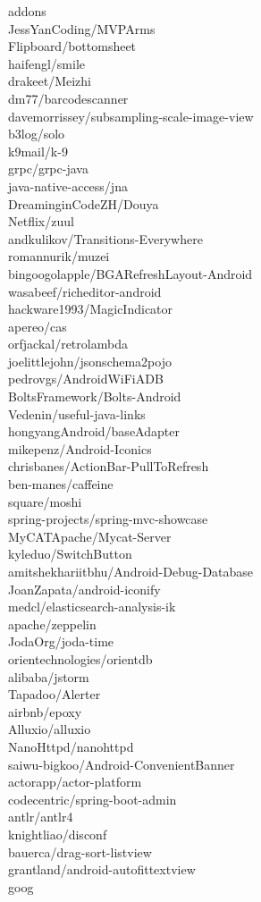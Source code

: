 \documentclass[twoside]{praca}
\begin{document}
\begin{multicols}{3}
addons\\JessYanCoding/MVPArms\\Flipboard/bottomsheet\\haifengl/smile\\drakeet/Meizhi\\dm77/barcodescanner\\davemorrissey/subsampling-scale-image-view\\b3log/solo\\k9mail/k-9\\grpc/grpc-java\\java-native-access/jna\\DreaminginCodeZH/Douya\\Netflix/zuul\\andkulikov/Transitions-Everywhere\\romannurik/muzei\\bingoogolapple/BGARefresh\-Layout-Android\\wasabeef/richeditor-android\\hackware1993/MagicIndicator\\apereo/cas\\orfjackal/retrolambda\\joelittlejohn/jsonschema2pojo\\pedrovgs/AndroidWiFiADB\\BoltsFramework/Bolts-Android\\Vedenin/useful-java-links\\hongyangAndroid/baseAdapter\\mikepenz/Android-Iconics\\chrisbanes/ActionBar-PullToRefresh\\ben-manes/caffeine\\square/moshi\\spring-projects/spring-mvc-showcase\\MyCATApache/Mycat-Server\\kyleduo/SwitchButton\\amitshekhariitbhu/Android-Debug-Database\\JoanZapata/android-iconify\\medcl/elasticsearch-analy\-sis-ik\\apache/zeppelin\\JodaOrg/joda-time\\orientechnologies/orientdb\\alibaba/jstorm\\Tapadoo/Alerter\\airbnb/epoxy\\Alluxio/alluxio\\NanoHttpd/nanohttpd\\saiwu-bigkoo/Android-ConvenientBanner\\actorapp/actor-platform\\codecentric/spring-boot-admin\\antlr/antlr4\\knightliao/disconf\\bauerca/drag-sort-listview\\grantland/android-autofittextview\\goog
\end{multicols}
\end{document}
